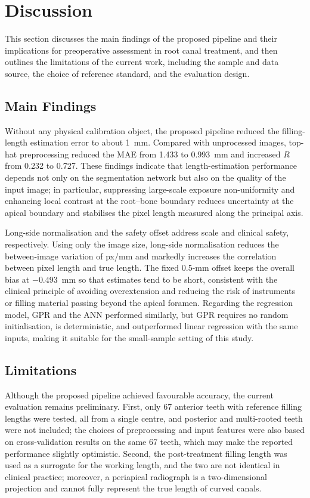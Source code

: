 \section{Discussion}

This section discusses the main findings of the proposed pipeline and their implications for preoperative assessment in root canal treatment, and then outlines the limitations of the current work, including the sample and data source, the choice of reference standard, and the evaluation design.

\subsection{Main Findings}
Without any physical calibration object, the proposed pipeline reduced the filling-length estimation error to about 1~mm. Compared with unprocessed images, top-hat preprocessing reduced the MAE from 1.433 to 0.993~mm and increased $R$ from 0.232 to 0.727. These findings indicate that length-estimation performance depends not only on the segmentation network but also on the quality of the input image; in particular, suppressing large-scale exposure non-uniformity and enhancing local contrast at the root--bone boundary reduces uncertainty at the apical boundary and stabilises the pixel length measured along the principal axis.

Long-side normalisation and the safety offset address scale and clinical safety, respectively. Using only the image size, long-side normalisation reduces the between-image variation of px/mm and markedly increases the correlation between pixel length and true length. The fixed 0.5-mm offset keeps the overall bias at $-0.493$~mm so that estimates tend to be short, consistent with the clinical principle of avoiding overextension and reducing the risk of instruments or filling material passing beyond the apical foramen. Regarding the regression model, GPR and the ANN performed similarly, but GPR requires no random initialisation, is deterministic, and outperformed linear regression with the same inputs, making it suitable for the small-sample setting of this study.

\subsection{Limitations}
Although the proposed pipeline achieved favourable accuracy, the current evaluation remains preliminary. First, only 67 anterior teeth with reference filling lengths were tested, all from a single centre, and posterior and multi-rooted teeth were not included; the choices of preprocessing and input features were also based on cross-validation results on the same 67 teeth, which may make the reported performance slightly optimistic. Second, the post-treatment filling length was used as a surrogate for the working length, and the two are not identical in clinical practice; moreover, a periapical radiograph is a two-dimensional projection and cannot fully represent the true length of curved canals.

